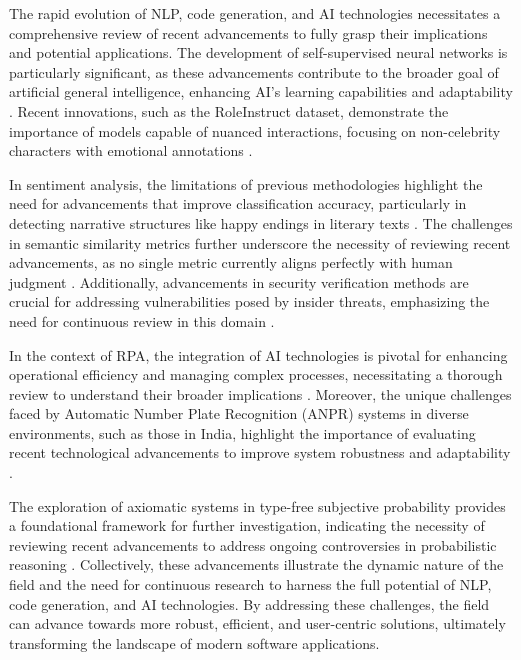 The rapid evolution of NLP, code generation, and AI technologies necessitates a comprehensive review of recent advancements to fully grasp their implications and potential applications. The development of self-supervised neural networks is particularly significant, as these advancements contribute to the broader goal of artificial general intelligence, enhancing AI's learning capabilities and adaptability \cite{le2019evolvingselfsupervisedneuralnetworks}. Recent innovations, such as the RoleInstruct dataset, demonstrate the importance of models capable of nuanced interactions, focusing on non-celebrity characters with emotional annotations \cite{tao2024rolecraftglmadvancingpersonalizedroleplaying}.



In sentiment analysis, the limitations of previous methodologies highlight the need for advancements that improve classification accuracy, particularly in detecting narrative structures like happy endings in literary texts \cite{jannidis2016analyzingfeaturesdetectionhappy}. The challenges in semantic similarity metrics further underscore the necessity of reviewing recent advancements, as no single metric currently aligns perfectly with human judgment \cite{yamshchikov2020styletransferparaphraselookingsensible}. Additionally, advancements in security verification methods are crucial for addressing vulnerabilities posed by insider threats, emphasizing the need for continuous review in this domain \cite{kammller2020applyingisabelleinsiderframework}.



In the context of RPA, the integration of AI technologies is pivotal for enhancing operational efficiency and managing complex processes, necessitating a thorough review to understand their broader implications \cite{pandy2024advancementsroboticsprocessautomation}. Moreover, the unique challenges faced by Automatic Number Plate Recognition (ANPR) systems in diverse environments, such as those in India, highlight the importance of evaluating recent technological advancements to improve system robustness and adaptability \cite{adak2022automaticnumberplaterecognition}.



The exploration of axiomatic systems in type-free subjective probability provides a foundational framework for further investigation, indicating the necessity of reviewing recent advancements to address ongoing controversies in probabilistic reasoning \cite{cieslinski2022axiomstypefreesubjectiveprobability}. Collectively, these advancements illustrate the dynamic nature of the field and the need for continuous research to harness the full potential of NLP, code generation, and AI technologies. By addressing these challenges, the field can advance towards more robust, efficient, and user-centric solutions, ultimately transforming the landscape of modern software applications.



